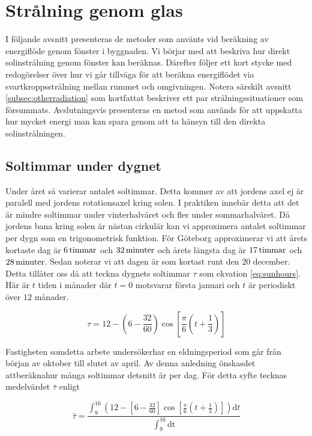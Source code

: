 \section{Strålning genom glas}\label{sec:sunthroughwindowsmethod}

I följande avsnitt presenteras de metoder som använts vid beräkning av energiflöde genom fönster i byggnaden. Vi börjar med att beskriva hur direkt solinstrålning genom fönster kan beräknas. Därefter följer ett kort stycke med redogörelser över hur vi går tillväga för att beräkna energiflödet via svartkroppsstrålning mellan rummet och omgivningen. Notera särskilt avsnitt \ref{subsec:otherradiation} som kortfattat beskriver ett par strålningssituationer som försummats. Avslutningsvis presenteras en metod som används för att uppskatta hur mycket energi man kan spara genom att ta hänsyn till den direkta solinstrålningen.

\subsection{Soltimmar under dygnet}
\label{subsec:sunhours}
Under året så varierar antalet soltimmar. Detta kommer av att jordens axel ej är paralell
med jordens rotationsaxel kring solen. I praktiken innebär detta att det är mindre soltimmar
under vinterhalvåret och fler under sommarhalvåret. Då jordens bana kring solen är nästan
cirkulär kan vi approximera antalet soltimmar per dygn som en trigonometrisk funktion.
För Göteborg approximerar vi att årets kortaste dag är $\unit[6]{ timmar}$ och $\unit[32]{minuter}$ och årets längsta
dag är $\unit[17]{ timmar}$ och $\unit[28]{ minuter}$. \cite{sunup} Sedan noterar vi att dagen är som kortast runt den $20$
december.
Detta tillåter oss då att teckna dygnets soltimmar $\tau$ som ekvation \eqref{eq:sunhours}. Här
är $t$ tiden i månader där $t=0$ motsvarar första januari och $t$ är periodiskt över $12$ månader.

\begin{equation}
\label{eq:sunhours}
\tau = 12 - \left(6-\frac{32}{60}\right)\cos\left[\frac{\pi}{6}\left(t+\frac{1}{3}\right)\right]
\end{equation}

\noindent
Fastigheten somdetta arbete undersökerhar en eldningsperiod som går från början av oktober
till slutet av april. Av denna anledning önskasdet attberäknahur många soltimmar detsnitt är per
dag. För detta syfte tecknas medelvärdet $\bar{\tau}$ enligt

\begin{equation}
\label{eq:taubar}
\bar{\tau}= \frac{ \int^{16}_9 \left(12 - \left[6-\frac{32}{60}\right]\cos\left[\frac{\pi}{6}\left(t+
\frac{1}{3}\right)\right]\right)\mathrm{d}t}{\int^{16}_9 \mathrm{dt}}
\end{equation}

